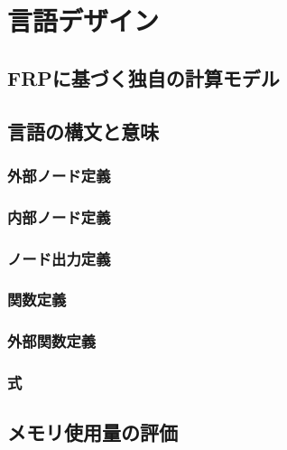 \chapter{言語デザイン}
\section{FRPに基づく独自の計算モデル}

\section{言語の構文と意味}
\subsection{外部ノード定義}
\subsection{内部ノード定義}
\subsection{ノード出力定義}
\subsection{関数定義}
\subsection{外部関数定義}
\subsection{式}

\section{メモリ使用量の評価}
